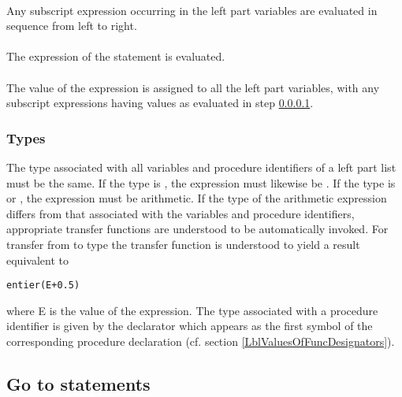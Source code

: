 \documentclass[a4paper,11pt]{article}
\begin{document}
\paragraph{} \label{LblAssignmentStatementSemanticsStep1} Any subscript
expression occurring in the left part variables are evaluated in
sequence from left to right.

\paragraph{} The expression of the statement is evaluated.

\paragraph{} The value of the expression is assigned to all the left part
variables, with any subscript expressions having values as evaluated
in step \ref{LblAssignmentStatementSemanticsStep1}.

\subsubsection{Types}
\label{LblAssignmentTypes}

The type associated with all variables and procedure identifiers of a
left part list must be the same.  If the type is , the
expression must likewise be .  If the type is
 or , the expression must be arithmetic.  If
the type of the arithmetic expression differs from that associated
with the variables and procedure identifiers, appropriate transfer
functions are understood to be automatically invoked.  For transfer
from  to  type the transfer function is
understood to yield a result equivalent to

\begin{flushleft}
\texttt{entier(E+0.5)}\\
\end{flushleft}

where E is the value of the expression.  The type associated with a
procedure identifier is given by the declarator which appears as the
first symbol of the corresponding procedure declaration (cf. section
\ref{LblValuesOfFuncDesignators}).


\subsection{Go to statements}
\label{LblGotoStatements}
\end{document}

